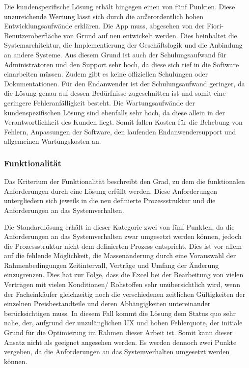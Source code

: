 Die kundenspezifische Lösung erhält hingegen einen von fünf Punkten. Diese unzureichende Wertung lässt sich durch die au\ss erordentlich hohen Entwicklungsaufwände erklären. Die App muss, abgesehen von der Fiori-Benutzeroberfläche von Grund auf neu entwickelt werden. Dies beinhaltet die Systemarchitektur, die Implementierung der Geschäftslogik und die Anbindung an andere Systeme. Aus diesem Grund ist auch der Schulungsaufwand für Administratoren und den Support sehr hoch, da diese sich tief in die Software einarbeiten müssen. Zudem gibt es keine offiziellen Schulungen oder Dokumentationen. Für den Endanwender ist der Schulungsaufwand geringer, da die Lösung genau auf dessen Bedürfnisse zugeschnitten ist und somit eine geringere Fehleranfälligkeit besteht. Die Wartungsaufwände der kundenspezifischen Lösung sind ebenfalls sehr hoch, da diese allein in der Verantwortlichkeit des Kunden liegt. Somit fallen Kosten für die Behebung von Fehlern, Anpassungen der Software, den laufenden Endanwendersupport und allgemeinen Wartungskosten an.

\subsubsection{Funktionalität}

Das Kriterium der Funktionalität beschreibt den Grad, zu dem die funktionalen Anforderungen durch eine Lösung erfüllt werden. Diese Anforderungen untergliedern sich jeweils in die neu definierte Prozessstruktur und die Anforderungen an das Systemverhalten.

Die Standardlösung erhält in dieser Kategorie zwei von fünf Punkten, da die Anforderungen an das Systemverhalten zwar umgesetzt werden können, jedoch die Prozessstruktur nicht dem definierten Prozess entspricht. Dies ist vor allem auf die fehlende Möglichkeit, die Massenänderung durch eine Vorauswahl der Rahmenbedingungen Zeitintervall, Verträge und Umfang der Änderung einzugrenzen. Dies hat zur Folge, dass die Excel bei der Bearbeitung von vielen Verträgen mit vielen Konditionen/ Rohstoffen sehr unübersichtlich wird, wenn der Facheinkäufer gleichzeitig noch die verschiedenen zeitlichen Gültigkeiten der einzelnen Preisbestandteile und deren Abhängigkeiten untereinander berücksichtigen muss. In diesem Fall kommt die Lösung dem Status quo sehr nahe, der, aufgrund der unzulänglichen UX und hohen Fehlerquote, der initiale Grund für die Optimierung im Rahmen dieser Arbeit ist. Somit kann dieser Ansatz nicht als geeignet angesehen werden. Es werden dennoch zwei Punkte vergeben, da die Anforderungen an das Systemverhalten umgesetzt werden können.

